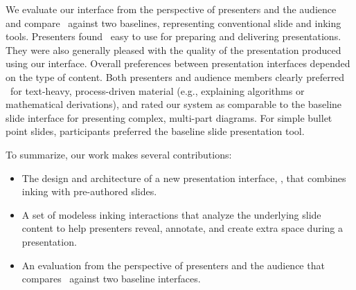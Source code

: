 We evaluate our interface from the perspective of presenters and the audience and compare \interface\ against two baselines, representing conventional slide and inking tools. Presenters found \interface\ easy to use for preparing and delivering presentations. They were also generally pleased with the quality of the presentation produced using our interface. 
%
Overall preferences between presentation interfaces depended on the type of content.
%
Both presenters and audience members clearly preferred \interface\ for text-heavy, process-driven material (e.g., explaining algorithms or mathematical derivations), and rated our system as comparable to the baseline slide interface for presenting complex, multi-part diagrams. 
%
For simple bullet point slides, participants preferred the baseline slide presentation tool. 

To summarize, our work makes several contributions: 
\begin{itemize}
  \item The design and architecture of a new presentation interface, \interface, that combines inking with pre-authored slides.
\item A set of modeless inking interactions that analyze the underlying slide content to help presenters reveal, annotate, and create extra space during a presentation.
  \item An evaluation from the perspective of presenters and the audience that compares \interface\ against two baseline interfaces.
\end{itemize}





